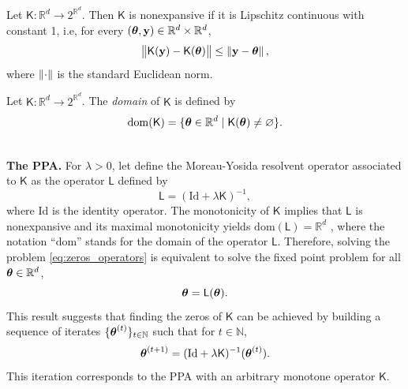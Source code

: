 \documentclass[nohypdvips,onefignum,onetabnum]{siamart171218}
\begin{document}
\begin{definition}[Nonexpansiveness]
  Let $\mathsf{K}: \mathbb{R}^d \rightarrow 2^{\mathbb{R}^d}$.
  Then $\mathsf{K}$ is nonexpansive if it is Lipschitz continuous with constant 1, i.e, for every $(\boldsymbol{\theta},\mathbf{y}) \in \mathbb{R}^d \times \mathbb{R}^d$,
  \begin{equation}
    \left\|\mathsf{K}(\mathbf{y})-\mathsf{K}(\boldsymbol{\theta})\right\| \leq \left\|\mathbf{y}-\boldsymbol{\theta}\right\|,
  \end{equation}
  where $\left\|\cdot\right\|$ is the standard Euclidean norm.
\end{definition}

\begin{definition}[Domain]
  Let $\mathsf{K}: \mathbb{R}^d \rightarrow 2^{\mathbb{R}^d}$.
  The \textit{domain} of $\mathsf{K}$ is defined by
  \begin{equation}
    \mathrm{dom}(\mathsf{K}) = \{\boldsymbol{\theta}\in \mathbb{R}^d \mid \mathsf{K}(\boldsymbol{\theta})\neq \varnothing\}.
  \end{equation}
\end{definition}

\text{}\\[0.5em]\noindent\textbf{The PPA.}
For $\lambda > 0$, let define the Moreau-Yosida resolvent operator associated to $\mathsf{K}$ as the operator $\mathsf{L}$ defined by
\begin{equation}
  \mathsf{L} = (\mathrm{Id} + \lambda \mathsf{K})^{-1},
\end{equation}
where $\mathrm{Id}$ is the identity operator.
The monotonicity of $\mathsf{K}$ implies that $\mathsf{L}$ is nonexpansive and its maximal monotonicity yields $\mathrm{dom}(\mathsf{L}) = \mathbb{R}^d$ \cite{Minty1962}, where the notation ``$\mathrm{dom}$'' stands for the domain of the operator $\mathsf{L}$.
Therefore, solving the problem \cref{eq:zeros_operators} is equivalent to solve the fixed point problem for all $\boldsymbol{\theta} \in \mathbb{R}^d$,
\begin{equation}
  \boldsymbol{\theta} = \mathsf{L}(\boldsymbol{\theta}).
\end{equation}
This result suggests that finding the zeros of $\mathsf{K}$ can be achieved by building a sequence of iterates $\{\boldsymbol{\theta}^{(t)}\}_{t\in\mathbb{N}}$ such that for $t \in \mathbb{N}$,
\begin{equation}
  \boldsymbol{\theta}^{(t+1)} = (\mathrm{Id} + \lambda \mathsf{K})^{-1}(\boldsymbol{\theta}^{(t)}).
\end{equation}
This iteration corresponds to the PPA with an arbitrary monotone operator $\mathsf{K}$.\\[0.5em]
\end{document}
